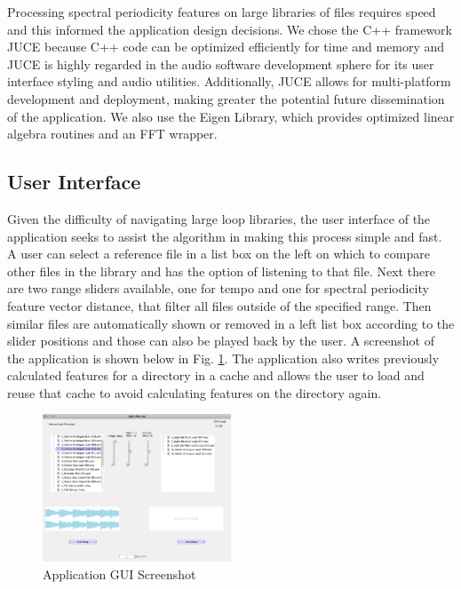 \documentclass{article}
\begin{document}
Processing spectral periodicity features on large libraries of files requires speed and this informed the application design decisions. We chose the C++ framework JUCE \cite{juce} because C++ code can be optimized efficiently for time and memory and JUCE is highly regarded in the audio software development sphere for its user interface styling and audio utilities. Additionally, JUCE allows for multi-platform development and deployment, making greater the potential future dissemination of the application. We also use the Eigen Library, which provides optimized linear algebra routines and an FFT wrapper.

\subsection{User Interface}
Given the difficulty of navigating large loop libraries, the user interface of the application seeks to assist the algorithm in making this process simple and fast. A user can select a reference file in a list box on the left on which to compare other files in the library and has the option of listening to that file. Next there are two range sliders available, one for tempo and one for spectral periodicity feature vector distance, that filter all files outside of the specified range. Then similar files are automatically shown or removed in a left list box according to the slider positions and those can also be played back by the user. A screenshot of the application is shown below in Fig. \ref{fig:gui}. The application also writes previously calculated features for a directory in a cache and allows the user to load and reuse that cache to avoid calculating features on the directory again.

\begin{figure}[h!]
  \centering
    \includegraphics[width=0.5\textwidth]{fLoop_gui.png}
      \caption{Application GUI Screenshot}\label{fig:gui}
\end{figure}
\end{document}
